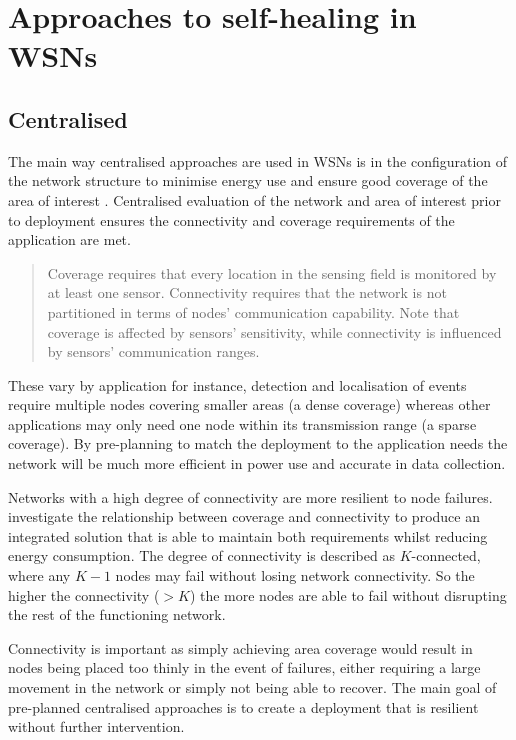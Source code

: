 \documentclass[authoryearcitations]{UoYCSproject}
\begin{document}
\section{Approaches to self-healing in WSNs}



\subsection{Centralised}

The main way centralised approaches are used in WSNs is in the configuration of the network structure to minimise energy use and ensure good coverage of the area of interest \citep{Wang2003,Ding2005,Wang2005,Derr2013}. Centralised evaluation of the network and area of interest prior to deployment ensures the connectivity and coverage requirements of the application are met.
\begin{quote}
Coverage requires that every location in the sensing field is monitored by at least one sensor. Connectivity requires that the network is not partitioned in terms of nodes' communication capability. Note that coverage is affected by sensors' sensitivity, while connectivity is influenced by sensors' communication ranges.
\citep{Wang2005}
\end{quote}
These vary by application for instance, detection and localisation of events require multiple nodes covering smaller areas (a dense coverage) whereas other applications may only need one node within its transmission range (a sparse coverage). By pre-planning to match the deployment to the application needs the network will be much more efficient in power use and accurate in data collection.

Networks with a high degree of connectivity are more resilient to node failures.  investigate the relationship between coverage and connectivity to produce an integrated solution that is able to maintain both requirements whilst reducing energy consumption. The degree of connectivity is described as $K$-connected, where any $K-1$ nodes may fail without losing network connectivity. So the higher the connectivity ($>K$) the more nodes are able to fail without disrupting the rest of the functioning network.

%

Connectivity is important as simply achieving area coverage would result in nodes being placed too thinly in the event of failures, either requiring a large movement in the network or simply not being able to recover. The main goal of pre-planned centralised approaches is to create a deployment that is resilient without further intervention.
\end{document}
